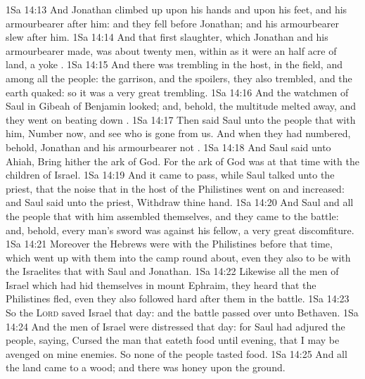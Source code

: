 \vs 1Sa 14:13 And Jonathan climbed up upon his hands and upon his feet, and his armourbearer after him: and they fell before Jonathan; and his armourbearer slew after him.
\vs 1Sa 14:14 And that first slaughter, which Jonathan and his armourbearer made, was about twenty men, within as it were an half acre of land,  a yoke .
\vs 1Sa 14:15 And there was trembling in the host, in the field, and among all the people: the garrison, and the spoilers, they also trembled, and the earth quaked: so it was a very great trembling.
\vs 1Sa 14:16 And the watchmen of Saul in Gibeah of Benjamin looked; and, behold, the multitude melted away, and they went on beating down .
\vs 1Sa 14:17 Then said Saul unto the people that  with him, Number now, and see who is gone from us. And when they had numbered, behold, Jonathan and his armourbearer  not .
\vs 1Sa 14:18 And Saul said unto Ahiah, Bring hither the ark of God. For the ark of God was at that time with the children of Israel.
\vs 1Sa 14:19 And it came to pass, while Saul talked unto the priest, that the noise that  in the host of the Philistines went on and increased: and Saul said unto the priest, Withdraw thine hand.
\vs 1Sa 14:20 And Saul and all the people that  with him assembled themselves, and they came to the battle: and, behold, every man's sword was against his fellow,  a very great discomfiture.
\vs 1Sa 14:21 Moreover the Hebrews  were with the Philistines before that time, which went up with them into the camp  round about, even they also  to be with the Israelites that  with Saul and Jonathan.
\vs 1Sa 14:22 Likewise all the men of Israel which had hid themselves in mount Ephraim,  they heard that the Philistines fled, even they also followed hard after them in the battle.
\vs 1Sa 14:23 So the \textsc{Lord} saved Israel that day: and the battle passed over unto Bethaven.
\vs 1Sa 14:24 And the men of Israel were distressed that day: for Saul had adjured the people, saying, Cursed  the man that eateth  food until evening, that I may be avenged on mine enemies. So none of the people tasted  food.
\vs 1Sa 14:25 And all  the land came to a wood; and there was honey upon the ground.
